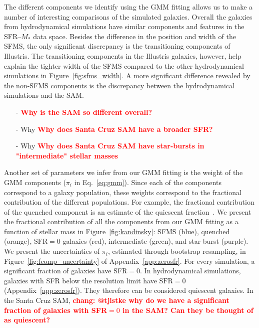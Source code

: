 \documentclass[preprint2,tighten]{aastex62}
\newcommand{\todo}[1]{{\bf \textcolor{red}{ #1}}}
\begin{document}
The different components we identify using the GMM fitting allows us to make a 
number of interesting comparisons of the simulated galaxies. Overall
the galaxies from hydrodynamical simulations have similar components
and features in the SFR--$M_*$ data space. Besides the difference in the 
position and width of the SFMS, 
the only significant discrepancy is the transitioning components of
Illustris. The transitioning components in the Illustris galaxies, however, 
help explain the tighter width of the SFMS compared to the other hydrodynamical 
simulations in Figure~\ref{fig:sfms_width}. A more significant difference 
revealed by the non-SFMS components is the discrepancy between the hydrodynamical 
simulations and the SAM. 
\begin{itemize}
    \item[-] \todo{Why is the SAM so different overall?}
    \item[-] Why \todo{Why does Santa Cruz SAM have a broader SFR?} 
    \item[-] Why \todo{Why does Santa Cruz SAM have star-bursts in "intermediate" stellar masses}
\end{itemize}

Another set of parameters we infer from our GMM fitting is the weight of the 
GMM components ($\pi_i$ in Eq.~\ref{eq:gmm}). Since each of the components 
correspond to a galaxy population, these weights correspond to the fractional
contribution of the different populations. For example, the fractional 
contribution of the quenched component is an estimate of the quiescent 
fraction~\citep[\emph{e.g.}][]{blanton2009, geha2012,hahn2015}. We present 
the fractional contribution of all the components from our GMM fitting as a
function of stellar mass in Figure~\ref{fig:kandinsky}: SFMS (blue), 
quenched (orange), $\mathrm{SFR}=0$ galaxies (red), intermediate (green), 
and star-burst (purple). We present the uncertainties of $\pi_i$, estimated
through bootstrap resampling, in Figure~\ref{fig:fcomp_uncertainty} of 
Appendix~\ref{app:zerosfr}. 
For every simulation, a significant fraction of galaxies have SFR$=0$. 
In hydrodynamical simulations, galaxies with SFR below the resolution 
limit have $\mathrm{SFR}{=}0$ (Appendix~\ref{app:zerosfr}). They therefore
can be considered quiescent galaxies. In the Santa Cruz SAM, 
\todo{chang: @tjistke why do we have a significant fraction 
of galaxies with SFR$=0$ in the SAM? Can they be thought of as quiescent?} 
\end{document}
